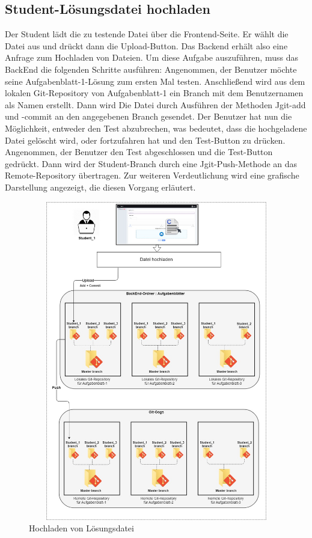 \documentclass[a4paper,12pt,oneside]{book}
\begin{document}
\subsection{Student-Lösungsdatei hochladen}
Der Student lädt die zu testende Datei über die Frontend-Seite. Er wählt die Datei aus und drückt dann die Upload-Button. Das Backend erhält also eine Anfrage zum Hochladen von Dateien. Um diese Aufgabe auszuführen, muss das BackEnd die folgenden Schritte ausführen: Angenommen, der Benutzer möchte seine Aufgabenblatt-1-Lösung zum ersten Mal testen. Anschließend wird aus dem lokalen Git-Repository von Aufgabenblatt-1 ein Branch mit dem Benutzernamen als Namen erstellt. Dann wird Die Datei durch Ausführen der Methoden Jgit-add und -commit an den angegebenen Branch gesendet. Der Benutzer hat nun die Möglichkeit, entweder den Test abzubrechen, was bedeutet, dass die hochgeladene Datei gelöscht wird, oder fortzufahren hat und den Test-Button zu drücken. Angenommen, der Benutzer den Test abgeschlossen und die Test-Button gedrückt. Dann wird der Student-Branch durch eine Jgit-Push-Methode an das Remote-Repository übertragen. Zur weiteren Verdeutlichung wird eine grafische Darstellung angezeigt, die diesen Vorgang erläutert.
\begin{figure}[h!]
	\begin{center}
		\includegraphics[width=14cm, height=14cm]{Loesungupload.jpg}
		\caption{Hochladen von Lösungsdatei} 
		\label{ Hochladen von Lösungsdatei } 
	\end{center}
\end{figure}
\end{document}

